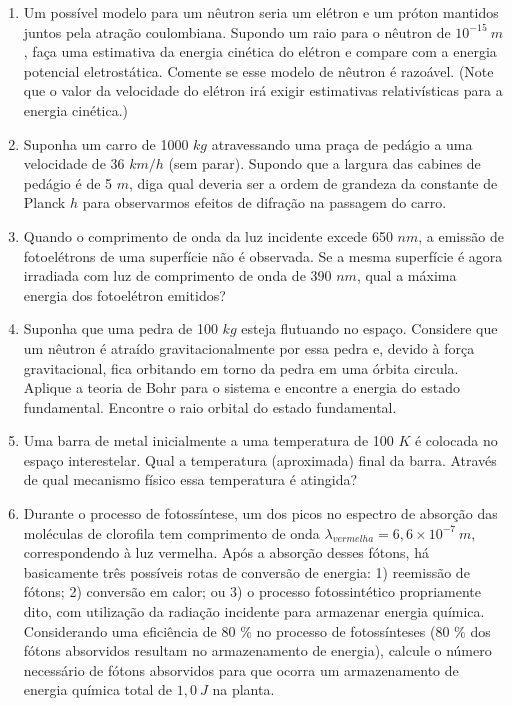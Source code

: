 \begin{enumerate}[start=1,label={\bfseries Q\arabic*.}]
\item Um possível modelo para um nêutron seria um elétron e um próton mantidos juntos pela atração coulombiana. Supondo um raio para o nêutron de $10^{-15} \ m$, faça uma estimativa da energia cinética do elétron e compare com a energia potencial eletrostática. Comente se esse modelo de nêutron é razoável. (Note que o valor da velocidade do elétron irá exigir estimativas relativísticas para a energia cinética.)


\item Suponha um carro de 1000 $kg$ atravessando uma praça de pedágio a uma velocidade de 36 $km/h$ (sem parar). Supondo que a largura das cabines de pedágio é de 5 $m$, diga qual deveria ser a ordem de grandeza da constante de Planck $h$ para observarmos efeitos de difração na passagem do carro.




\item Quando o comprimento de onda da luz incidente excede 650 $nm$, a emissão de fotoelétrons de uma superfície não é observada. Se a mesma superfície é agora irradiada com luz de comprimento de onda de 390 $nm$, qual a máxima energia dos fotoelétron emitidos?


\item Suponha que uma pedra de 100 $kg$ esteja flutuando no espaço. Considere que um nêutron é atraído gravitacionalmente por essa pedra e, devido à força gravitacional, fica orbitando em torno da pedra em uma órbita circula. Aplique a teoria de Bohr para o sistema e encontre a energia do estado fundamental. Encontre o raio orbital do estado fundamental.


\item Uma barra de metal inicialmente a uma temperatura de 100 $K$ é colocada no espaço interestelar. Qual a temperatura (aproximada) final da barra. Através de qual mecanismo físico essa temperatura é atingida?



\item Durante o processo de fotossíntese, um dos picos no espectro de absorção das moléculas de clorofila tem comprimento de onda $\lambda_{vermelha} = 6,6 \times 10^{-7} \ m$, correspondendo à luz vermelha. Após a absorção desses fótons, há basicamente três possíveis rotas de conversão de energia: 1) reemissão de fótons; 2) conversão em calor; ou 3) o processo fotossintético propriamente dito, com utilização da radiação incidente para armazenar energia química. Considerando uma eficiência de 80 $\%$ no processo de fotossínteses (80 $\%$ dos fótons absorvidos resultam no armazenamento de energia), calcule o número necessário de fótons absorvidos para que ocorra um armazenamento de energia química total de $1,0 \ J$ na planta.



\end{enumerate}
